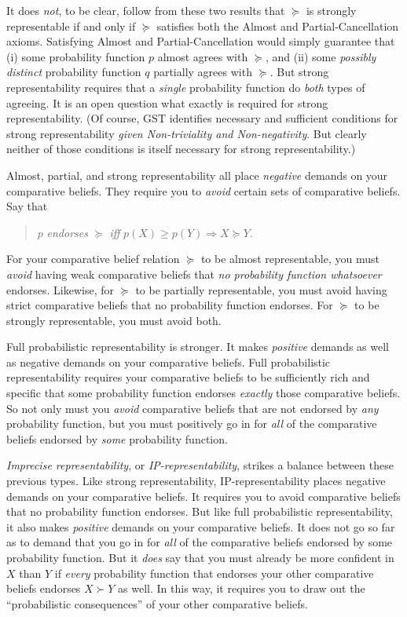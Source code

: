 It does \textit{not}, to be clear, follow from these two results that $\succeq$ is strongly representable if and only if $\succeq$ satisfies both the Almost and Partial-Cancellation axioms. Satisfying Almost and Partial-Cancellation would simply guarantee that (i) some probability function $p$ almost agrees with $\succeq$, and (ii) some \textit{possibly distinct} probability function $q$ partially agrees with $\succeq$. But strong representability requires that a \textit{single} probability function do \textit{both} types of agreeing. It is an open question what exactly is required for strong representability. (Of course, GST identifies necessary and sufficient conditions for strong representability \textit{given Non-triviality and Non-negativity}. But clearly neither of those conditions is itself necessary for strong representability.)

Almost, partial, and strong representability all place \textit{negative} demands on your comparative beliefs. They require you to \textit{avoid} certain sets of comparative beliefs. Say that 
\begin{quote}\centering
$p$ \emph{endorses} $\succeq$ \hspace{.3em}\emph{iff}\hspace{.2em} $p(X)\geq p(Y) \Rightarrow X\succeq Y$.
\end{quote}
For your comparative belief relation $\succeq$ to be almost representable, you must \textit{avoid} having weak comparative beliefs that \textit{no probability function whatsoever} endorses. Likewise, for $\succeq$ to be partially representable, you must avoid having strict comparative beliefs that no probability function endorses. For $\succeq$ to be strongly representable, you must avoid both.

Full probabilistic representability is stronger. It makes \textit{positive} demands as well as negative demands on your comparative beliefs. Full probabilistic representability requires your comparative beliefs to be sufficiently rich and specific that some probability function endorses \textit{exactly} those comparative beliefs. So not only must you \textit{avoid} comparative beliefs that are not endorsed by \textit{any} probability function, but you must positively go in for \textit{all} of the comparative beliefs endorsed by \textit{some} probability function.

\textit{Imprecise representability}, or \textit{IP-representability}, strikes a balance between these previous types. Like strong representability, IP-representability places negative demands on your comparative beliefs. It requires you to avoid comparative beliefs that no probability function endorses. But like full probabilistic representability, it also makes \textit{positive} demands on your comparative beliefs. It does not go so far as to demand that you go in for \textit{all} of the comparative beliefs endorsed by some probability function. But it \textit{does} say that you must already be more confident in $X$ than $Y$ if \textit{every} probability function that endorses your other comparative beliefs endorses $X\succ Y$ as well. In this way, it requires you to draw out the ``probabilistic consequences'' of your other comparative beliefs.

